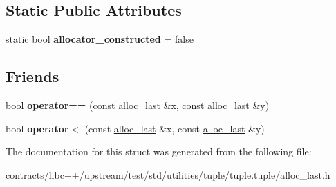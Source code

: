 \subsection*{Static Public Attributes}
\begin{DoxyCompactItemize}
\item 
\mbox{\label{structalloc__last_a2dedc0a7733e565265012ef854234c0f}} 
static bool {\bfseries allocator\+\_\+constructed} = false
\end{DoxyCompactItemize}
\subsection*{Friends}
\begin{DoxyCompactItemize}
\item 
\mbox{\label{structalloc__last_aa32348f8d31b9a73a39fc1333e61362f}} 
bool {\bfseries operator==} (const \mbox{\hyperlink{structalloc__last}{alloc\+\_\+last}} \&x, const \mbox{\hyperlink{structalloc__last}{alloc\+\_\+last}} \&y)
\item 
\mbox{\label{structalloc__last_a5c4f8d016e9eb3e5c50010b010c2b944}} 
bool {\bfseries operator$<$} (const \mbox{\hyperlink{structalloc__last}{alloc\+\_\+last}} \&x, const \mbox{\hyperlink{structalloc__last}{alloc\+\_\+last}} \&y)
\end{DoxyCompactItemize}


The documentation for this struct was generated from the following file\+:\begin{DoxyCompactItemize}
\item 
contracts/libc++/upstream/test/std/utilities/tuple/tuple.\+tuple/alloc\+\_\+last.\+h\end{DoxyCompactItemize}
